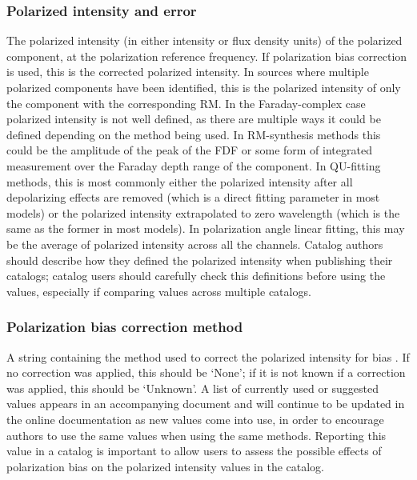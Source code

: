 \documentclass[10pt,modern]{aastex63}
\begin{document}
\subsubsection{Polarized intensity and error}
The polarized intensity (in either intensity or flux density units) of the polarized component, at the polarization reference frequency. If polarization bias correction is used, this is the corrected polarized intensity. In sources where multiple polarized components have been identified, this is the polarized intensity of only the component with the corresponding RM. In the Faraday-complex case polarized intensity is not well defined, as there are multiple ways it could be defined depending on the method being used. In RM-synthesis methods this could be the amplitude of the peak of the FDF or some form of integrated measurement over the Faraday depth range of the component. In QU-fitting methods, this is most commonly either the polarized intensity after all depolarizing effects are removed (which is a direct fitting parameter in most models) or the polarized intensity extrapolated to zero wavelength (which is the same as the former in most models). In polarization angle linear fitting, this may be the average of polarized intensity across all the channels. Catalog authors should describe how they defined the polarized intensity when publishing their catalogs; catalog users should carefully check this definitions before using the values, especially if comparing values across multiple catalogs.

\subsubsection{Polarization bias correction method}
A string containing the method used to correct the polarized intensity for bias \citep[e.g., ][]{Wardle1974, Simmons1985}. If no correction was applied, this should be `None'; if it is not known if a correction was applied, this should be `Unknown'. A list of currently used or suggested values appears in an accompanying document and will continue to be updated in the online documentation as new values come into use, in order to encourage authors to use the same values when using the same methods. Reporting this value in a catalog is important to allow users to assess the possible effects of polarization bias on the polarized intensity values in the catalog.
\end{document}
